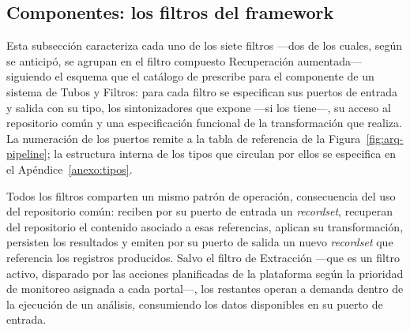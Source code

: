 \documentclass[12pt]{report}
\begin{document}
\subsection{Componentes: los filtros del framework}
\label{sec:arq-car-filtros}

Esta subsección caracteriza cada uno de los siete filtros ---dos de los cuales, según se anticipó, se agrupan en el filtro compuesto Recuperación aumentada--- siguiendo el esquema que el catálogo de \citet{cristia:2025} prescribe para el componente de un sistema de Tubos y Filtros: para cada filtro se especifican sus puertos de entrada y salida con su tipo, los sintonizadores que expone ---si los tiene---, su acceso al repositorio común y una especificación funcional de la transformación que realiza. La numeración de los puertos remite a la tabla de referencia de la Figura~\ref{fig:arq-pipeline}; la estructura interna de los tipos que circulan por ellos se especifica en el Apéndice~\ref{anexo:tipos}.

Todos los filtros comparten un mismo patrón de operación, consecuencia del uso del repositorio común: reciben por su puerto de entrada un \textit{recordset}, recuperan del repositorio el contenido asociado a esas referencias, aplican su transformación, persisten los resultados y emiten por su puerto de salida un nuevo \textit{recordset} que referencia los registros producidos. Salvo el filtro de Extracción ---que es un filtro activo, disparado por las acciones planificadas de la plataforma según la prioridad de monitoreo asignada a cada portal---, los restantes operan a demanda dentro de la ejecución de un análisis, consumiendo los datos disponibles en su puerto de entrada.
\end{document}
